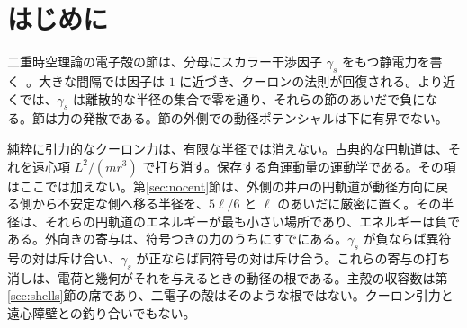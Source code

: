 \documentclass[a4paper]{article}
\begin{document}
\begin{abstract}
e^{2}/\ell^{3}\) である。その対の分数 \(2/z\) だけを運ぶ最近接結合には、静電力の各成分が消える点がさらにある。近傍が八個および十二個のとき、それらの点は鞍点であり、部分力は共有結合の対角線に対して比 \(0.04323\) と \(0.1704\) にある。辺の長さの数倍だけ離れた二つの中性な対は、単極子が消えたあとも力を残す。その正方形の辺はボーア半径ではない。ボーア半径での実験室の符号は引力であるから、その半径は外側の井戸にあり、正方形は反転した層にある。同じ層状の符号を重力チャネルで読むと、それは共有された席の排他である。二つの電子質量を第一の重力節の内側に置くと、それらは単純極に出会う。\(G m_e^{2}\) の小ささはその近傍を薄くし、極は消さない。半径を戻す点は外向きの力の符号の境界であり、電子はそこを横切って振動する。正方形の上では、電子の波長と対角線の波長との比は \(45.08\) である。電子の座標における \(K/m\) と対角線における \(K/m\) との比の平方根であり、辺の同定をこの比は要しない。遷移の振動数は固有値の差であり、温度に比例して伸び縮みできない。定常軌道は電子の運動を固定する。陽子に対する電子の速度の差は、軌道が計算する量ではなく、温度とともに変わらない。調和振動子の梯子の上では、基底状態より上の量子の平均個数は \(1/(e^{x}-1)\) である。ここで \(x\) は \(k_B T\) を単位とした間隔である。大きな空洞では、モードの数が振動数の二乗に比例して増える。この増え方は空洞の幾何である。波長の密度は、そのとき \(k_B T\) を単位として \(9/2\) と \(5\) のあいだにただ一つの最大をもつ。実験室の値 \(4.96\,k_B T\) がその最大であり、したがってピークの波長と温度との積は定数である。積分した振動数密度は \(T^{4}\) に比例し、一つの古典的な根の電力は \(T\) に比例する。定数 \(h\)、\(k_B\)、\(c\)、およびモード数の増え方は、入力である。
\end{abstract}

\section{はじめに}

二重時空理論の電子殻の節は、分母にスカラー干渉因子 \(\gamma_s\) をもつ静電力を書く~\cite{dst-main}。大きな間隔では因子は \(1\) に近づき、クーロンの法則が回復される。より近くでは、\(\gamma_s\) は離散的な半径の集合で零を通り、それらの節のあいだで負になる。節は力の発散である。節の外側での動径ポテンシャルは下に有界でない。

純粋に引力的なクーロン力は、有限な半径では消えない。古典的な円軌道は、それを遠心項 \(L^{2}/(m r^{3})\) で打ち消す。保存する角運動量の運動学である。その項はここでは加えない。第\ref{sec:nocent}節は、外側の井戸の円軌道が動径方向に戻る側から不安定な側へ移る半径を、\(5\ell/6\) と \(\ell\) のあいだに厳密に置く。その半径は、それらの円軌道のエネルギーが最も小さい場所であり、エネルギーは負である。外向きの寄与は、符号つきの力のうちにすでにある。\(\gamma_s\) が負ならば異符号の対は斥け合い、\(\gamma_s\) が正ならば同符号の対は斥け合う。これらの寄与の打ち消しは、電荷と幾何がそれを与えるときの動径の根である。主殻の収容数は第\ref{sec:shells}節の席であり、二電子の殻はそのような根ではない。クーロン引力と遠心障壁との釣り合いでもない。
\end{document}
